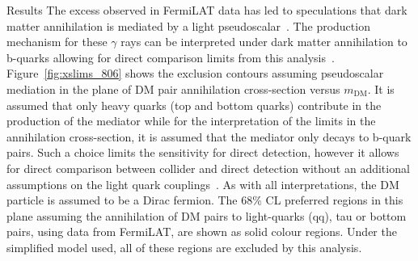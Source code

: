 \begin{section}{Results}
The excess observed in FermiLAT data has led to speculations that dark matter annihilation is mediated by a light pseudoscalar~\cite{Calore:2014nla}. 
The production mechanism for these $\gamma$ rays can be interpreted under dark matter annihilation to b-quarks allowing for direct 
comparison limits from this analysis~\cite{Buchmueller:2015eea,Buckley:2014fba,Harris:2014hga}. Figure~\ref{fig:xslims_806} shows 
the exclusion contours assuming pseudoscalar mediation in the plane of DM pair annihilation cross-section versus $m_{\textrm{DM}}$. 
It is assumed that only heavy quarks (top and bottom quarks) contribute in the production of the mediator while for  
the interpretation of the limits in the annihilation cross-section, it is assumed that the mediator only decays to b-quark pairs. 
Such a choice limits the sensitivity for direct 
detection, however it allows for direct comparison between collider and direct detection without an additional assumptions 
on the light quark couplings~\cite{Harris:2015kda}. As with all interpretations, the DM particle is assumed to be a Dirac fermion.
The 68\% CL preferred regions in this plane assuming the annihilation of DM pairs to light-quarks (qq), tau or bottom pairs, using data from FermiLAT, 
are shown as solid colour regions. Under the simplified model used, all of these regions are excluded by this analysis.



\end{section}
